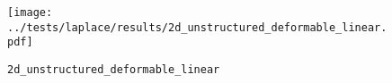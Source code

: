 

%

\begin{figure}[h!]
  \centering%
  \texttt{[image: ../tests/laplace/results/2d\_unstructured\_deformable\_linear.pdf]}
  \caption{\lstinline{2d_unstructured_deformable_linear}}
\end{figure} 




